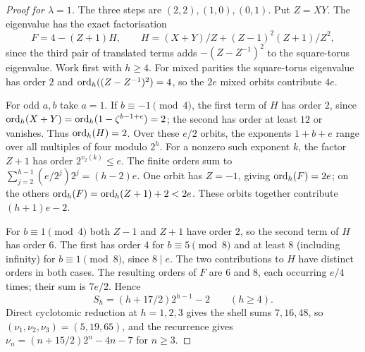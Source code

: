 \begin{proof}[Proof for $\lambda=1$]
The three steps are $(2,2),(1,0),(0,1)$. Put $Z=XY$. The eigenvalue has the
exact factorisation
\[
 F=4-(Z+1)H,\qquad H=(X+Y)/Z+(Z-1)^2(Z+1)/Z^2,
\]
since the third pair of translated terms adds $-(Z-Z^{-1})^2$ to the
square-torus eigenvalue. Work first with $h\ge4$. For mixed parities the
square-torus eigenvalue has order $2$ and $\operatorname{ord}_h((Z-Z^{-1})^2)=4$, so the
$2e$ mixed orbits contribute $4e$.

For odd $a,b$ take $a=1$. If $b\equiv-1\pmod4$, the first term of $H$ has
order $2$, since $\operatorname{ord}_h(X+Y)=\operatorname{ord}_h(1-\zeta^{b-1+e})=2$; the second has
order at least $12$ or vanishes. Thus $\operatorname{ord}_h(H)=2$. Over these $e/2$
orbits, the exponents $1+b+e$ range over all multiples of four modulo
$2^h$. For a nonzero such exponent $k$, the factor $Z+1$ has order
$2^{v_2(k)}\le e$. The finite orders sum to
$\sum_{j=2}^{h-1}(e/2^j)2^j=(h-2)e$. One orbit has $Z=-1$, giving
$\operatorname{ord}_h(F)=2e$; on the others $\operatorname{ord}_h(F)=\operatorname{ord}_h(Z+1)+2<2e$. These orbits
together contribute $(h+1)e-2$.

For $b\equiv1\pmod4$ both $Z-1$ and $Z+1$ have order $2$, so the second
term of $H$ has order $6$. The first has order $4$ for $b\equiv5\pmod8$ and
at least $8$ (including infinity) for $b\equiv1\pmod8$, since $8\mid e$.
The two contributions to $H$ have distinct orders in both cases. The
resulting orders of $F$ are $6$ and $8$, each occurring $e/4$ times; their
sum is $7e/2$. Hence
\[
 S_h=(h+17/2)2^{h-1}-2\qquad(h\ge4).
\]
Direct cyclotomic reduction at $h=1,2,3$ gives the shell sums $7,16,48$,
so $(\nu_1,\nu_2,\nu_3)=(5,19,65)$, and the recurrence gives
$\nu_n=(n+15/2)2^n-4n-7$ for $n\ge3$.
\end{proof}

